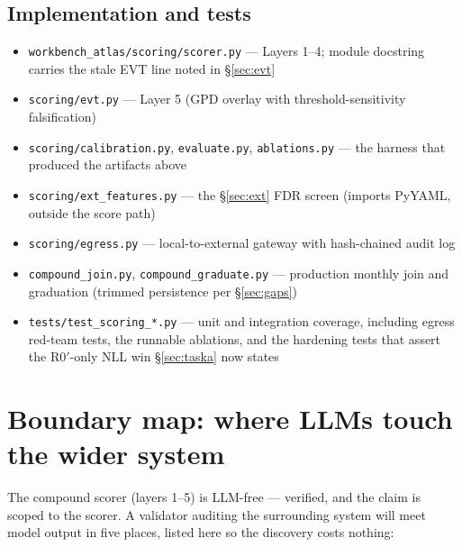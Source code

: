 \documentclass[11pt]{article}
\begin{document}
\subsection{Implementation and tests}

\begin{itemize}[leftmargin=1.4em,itemsep=1pt]
\item \texttt{workbench\_atlas/scoring/scorer.py} --- Layers 1--4; module
  docstring carries the stale EVT line noted in \S\ref{sec:evt}
\item \texttt{scoring/evt.py} --- Layer 5 (GPD overlay with
  threshold-sensitivity falsification)
\item \texttt{scoring/calibration.py}, \texttt{evaluate.py},
  \texttt{ablations.py} --- the harness that produced the artifacts above
\item \texttt{scoring/ext\_features.py} --- the \S\ref{sec:ext} FDR screen
  (imports PyYAML, outside the score path)
\item \texttt{scoring/egress.py} --- local-to-external gateway with
  hash-chained audit log
\item \texttt{compound\_join.py}, \texttt{compound\_graduate.py} ---
  production monthly join and graduation (trimmed persistence per
  \S\ref{sec:gaps})
\item \texttt{tests/test\_scoring\_*.py} --- unit and integration coverage,
  including egress red-team tests, the runnable ablations, and the
  hardening tests that assert the R0$'$-only NLL win \S\ref{sec:taska} now
  states
\end{itemize}

\section{Boundary map: where LLMs touch the wider system}
\label{app:boundary}

The compound scorer (layers 1--5) is LLM-free --- verified, and the claim is
scoped to the scorer. A validator auditing the surrounding system will meet
model output in five places, listed here so the discovery costs nothing:
\end{document}
